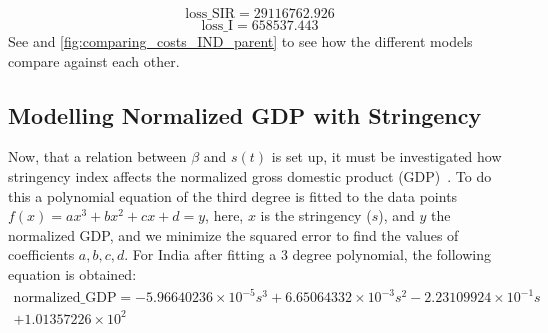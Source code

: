 \documentclass[tikz,fleqn,12pt]{wlscirep}
\begin{document}
\begin{equation}
  \textrm{loss\_SIR} = 29116762.926
  \label{eq:cost_SIR_with_lockdown_and_time_varying_nu}
\end{equation}
\begin{equation}
  \textrm{loss\_I} = 658537.443
  \label{eq:cost_I_with_lockdown_and_time_varying_nu}
\end{equation}
See  and \cref{fig:comparing_costs_IND_parent} to see how the different models compare against each other.

\subsection{Modelling Normalized GDP with Stringency}
Now, that a relation between $\beta$ and $s(t)$ is set up, it must be investigated how stringency index affects the normalized gross domestic product (GDP)~\cite{OECDNormalizedGDP,OECDNormalizedGDP2}. To do this a polynomial equation of the third degree is fitted to the data points $f(x) = a x^3 + b x^2 + c x + d = y$, here, $x$ is the stringency ($s$), and $y$ the normalized GDP, and we minimize the squared error to find the values of coefficients $a, b, c, d$. For India after fitting a 3 degree polynomial, the following equation is obtained:
\begin{equation}
    \begin{split}
      \textrm{normalized\_GDP} = -5.96640236 \times 10^{-5} s^{3} + 6.65064332 \times 10^{-3} s^{2} - 2.23109924 \times 10^{-1} s \\
    + 1.01357226 \times 10^{2}
    \end{split}
    \label{eq:gdp_modelled_with_stringency_IND}
\end{equation}
\end{document}
